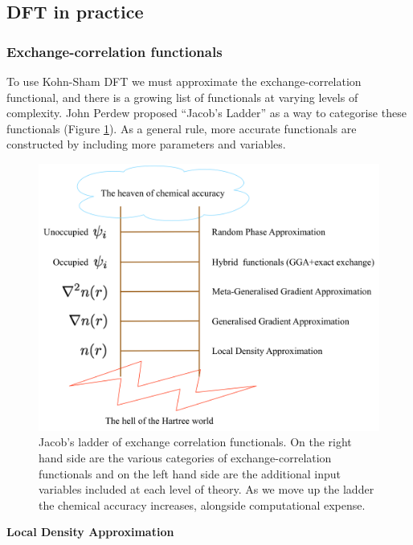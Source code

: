 \subsection{DFT in practice}

\subsubsection{Exchange-correlation functionals}
To use Kohn-Sham DFT we must approximate the exchange-correlation functional, and there is a growing list of functionals at varying levels of complexity. John Perdew proposed ``Jacob's Ladder'' as a way to categorise these functionals (Figure \ref{jladder}). As a general rule, more accurate functionals are constructed by including more parameters and variables.

\begin{figure}[h]
\centering
  \includegraphics[width=0.8\columnwidth]{figures/ch3/jladder.png}
  \caption[Jacob's ladder of exchange-correlation functionals]{Jacob's ladder of exchange correlation functionals. On the right hand side are the various categories of exchange-correlation functionals and on the left hand side are the additional input variables included at each level of theory. As we move up the ladder the chemical accuracy increases, alongside computational expense.}
  \label{jladder}
\end{figure}


\textbf{Local Density Approximation} 

